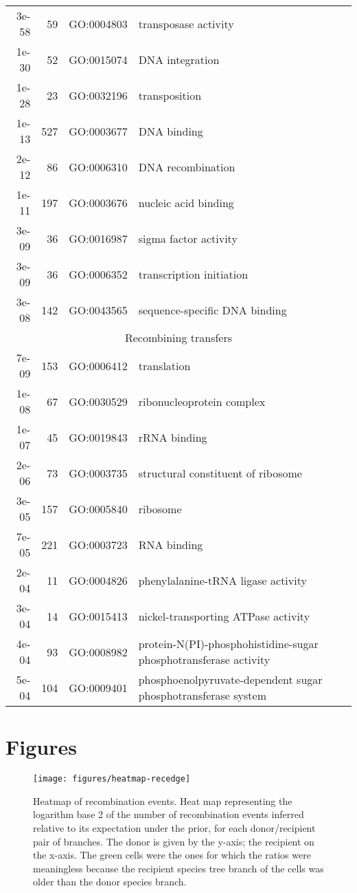 \documentclass[english]{article}
\begin{document}
\begin{table}
\begin{tabular}{rrll}
3e-58 &  59 & GO:0004803 & transposase activity\\
1e-30 &  52 & GO:0015074 & DNA integration\\
1e-28 &  23 & GO:0032196 & transposition\\
1e-13 & 527 & GO:0003677 & DNA binding\\
2e-12 &  86 & GO:0006310 & DNA recombination\\
1e-11 & 197 & GO:0003676 & nucleic acid binding\\
3e-09 &  36 & GO:0016987 & sigma factor activity\\
3e-09 &  36 & GO:0006352 & transcription initiation\\
3e-08 & 142 & GO:0043565 & sequence-specific DNA binding\\
\hline
\hline
\multicolumn{4}{c}{Recombining transfers} \\
\hline
7e-09 & 153 & GO:0006412 & translation\\
1e-08 &  67 & GO:0030529 & ribonucleoprotein complex\\
1e-07 &  45 & GO:0019843 & rRNA binding\\
2e-06 &  73 & GO:0003735 & structural constituent of ribosome\\
3e-05 & 157 & GO:0005840 & ribosome\\
7e-05 & 221 & GO:0003723 & RNA binding\\
2e-04 &  11 & GO:0004826 & phenylalanine-tRNA ligase activity\\
3e-04 &  14 & GO:0015413 & nickel-transporting ATPase activity\\
4e-04 &  93 & GO:0008982 & protein-N(PI)-phosphohistidine-sugar phosphotransferase activity\\
5e-04 & 104 & GO:0009401 & phosphoenolpyruvate-dependent sugar phosphotransferase system\\
\end{tabular}

\end{table}



\clearpage{}


\section*{Figures\clearpage{}}

\begin{figure}
\texttt{[image: figures/heatmap-recedge]}
\caption{\label{fig:Heatmap-of-recombination}Heatmap of recombination events.
Heat map representing the logarithm base 2 of the number of recombination
events inferred relative to its expectation under the prior, for each
donor/recipient pair of branches. The donor is given by the y-axis;
the recipient on the x-axis.  The
green cells were the ones for which the ratios were meaningless because
the recipient species tree branch of the cells was older than the
donor species branch.}
\end{figure}
\clearpage{}%
\end{document}
